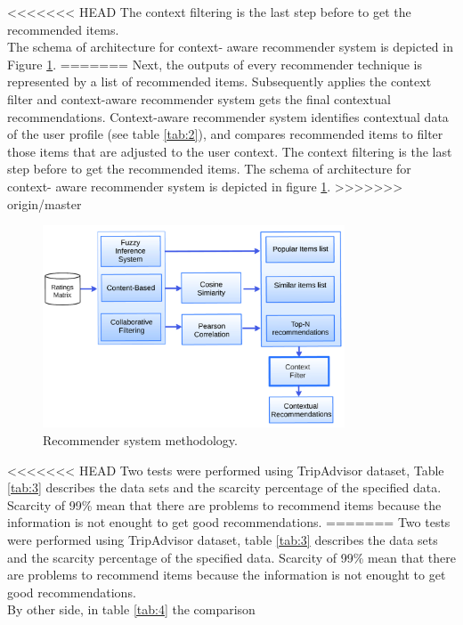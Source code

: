 <<<<<<< HEAD
The context filtering is the last step before to
get the recommended items. \\The schema of architecture for context-
aware recommender system is depicted in Figure  \ref{fig:architecture}.
=======
Next, the outputs of every recommender technique is represented by a
list of recommended items. Subsequently applies the context filter and
context-aware recommender system gets the final contextual
recommendations. Context-aware recommender system identifies
contextual data of the user profile (see table \ref{tab:2}), and
compares recommended items to filter those items that are adjusted to
the user context.  The context filtering is the last step before to
get the recommended items. The schema of architecture for context-
aware recommender system is depicted in figure \ref{fig:architecture}.
>>>>>>> origin/master
\begin{figure}
\captionsetup{font=footnotesize}
\centering
\includegraphics[width=0.80\textwidth]{img/archit-ta.png}
\caption{Recommender system methodology.}
\label{fig:architecture}   
\end{figure}
<<<<<<< HEAD
Two tests were performed using TripAdvisor dataset, 
Table  \ref{tab:3} describes the data sets and the scarcity percentage of the
specified data. \\ Scarcity of 99\% mean that there are problems to
recommend items because the information is not enought to get 
good recommendations.
=======
Two tests were performed using TripAdvisor dataset, table
\ref{tab:3} describes the data sets and the scarcity percentage of the
specified data. Scarcity of 99\% mean that there are problems to
recommend items because the information is not enought to get 
good recommendations.\\  By other side, in table \ref{tab:4} the comparison
